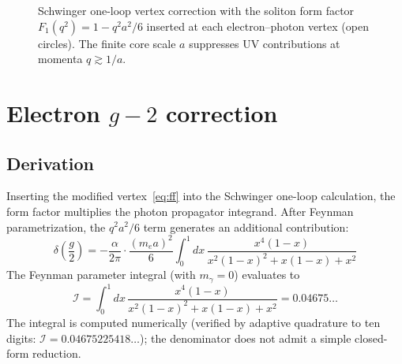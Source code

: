 ﻿\documentclass[a4paper,12pt]{article}
\begin{document}
\begin{figure}[t]
\centering
{}
\caption{Schwinger one-loop vertex correction with the soliton
form factor $F_1(q^2)=1-q^2a^2/6$ inserted at each electron--photon
vertex (open circles).  The finite core scale $a$ suppresses UV
contributions at momenta $q\gtrsim 1/a$.}
\label{fig:schwinger_sketch}
\end{figure}

\section{Electron $g{-}2$ correction}
\label{sec:g2}

\subsection{Derivation}

Inserting the modified vertex~\eqref{eq:ff} into the Schwinger one-loop
calculation, the form factor multiplies the photon propagator integrand.
After Feynman parametrization, the $q^2a^2/6$ term generates an
additional contribution:
\begin{equation}
  \delta\!\left(\frac{g}{2}\right)
    = -\frac{\alpha}{2\pi}\cdot\frac{(m_e a)^2}{6}
      \int_0^1 dx\,\frac{x^4(1-x)}{x^2(1-x)^2+x(1-x)+x^2}
\end{equation}
The Feynman parameter integral (with $m_\gamma=0$) evaluates to
\begin{equation}
  \mathcal{I} = \int_0^1 dx\,\frac{x^4(1-x)}{x^2(1-x)^2+x(1-x)+x^2}
    = 0.04675\ldots
  \label{eq:integral}
\end{equation}
The integral is computed numerically (verified by adaptive quadrature
to ten digits: $\mathcal{I}=0.04675225418\ldots$); the denominator
does not admit a simple closed-form reduction.
\end{document}
